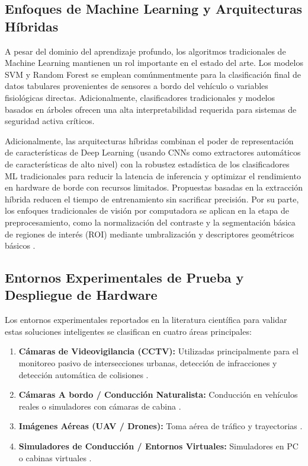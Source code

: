 \subsection{Enfoques de Machine Learning y Arquitecturas Híbridas}
A pesar del dominio del aprendizaje profundo, los algoritmos tradicionales de Machine Learning mantienen un rol importante en el estado del arte. Los modelos SVM \cite{abarghooei2026driving, ahmad2026comparative} y Random Forest \cite{uddin2025abnormal, usman2024distracted} se emplean comúnmentmente para la clasificación final de datos tabulares provenientes de sensores a bordo del vehículo o variables fisiológicas directas. Adicionalmente, clasificadores tradicionales \cite{essahraui2025realtime, wu2024driving} y modelos basados en árboles \cite{xue2023young, dong2022fatigue} ofrecen una alta interpretabilidad requerida para sistemas de seguridad activa críticos.

Adicionalmente, las arquitecturas híbridas \cite{ahmad2026comparative, essahraui2025realtime} combinan el poder de representación de características de Deep Learning (usando CNNs como extractores automáticos de características de alto nivel) con la robustez estadística de los clasificadores ML tradicionales para reducir la latencia de inferencia y optimizar el rendimiento en hardware de borde con recursos limitados. Propuestas basadas en la extracción híbrida \cite{mota2025integration, suresh2025traffic} reducen el tiempo de entrenamiento sin sacrificar precisión. Por su parte, los enfoques tradicionales de visión por computadora  se aplican en la etapa de preprocesamiento, como la normalización del contraste y la segmentación básica de regiones de interés (ROI) mediante umbralización y descriptores geométricos básicos .

\subsection{Entornos Experimentales de Prueba y Despliegue de Hardware}
Los entornos experimentales reportados en la literatura científica para validar estas soluciones inteligentes se clasifican en cuatro áreas principales:
\begin{enumerate}
    \item \textbf{Cámaras de Videovigilancia (CCTV):} Utilizadas principalmente para el monitoreo pasivo de intersecciones urbanas, detección de infracciones y detección automática de colisiones \cite{l2026safestreets, kumar2026intelligent}.
    \item \textbf{Cámaras A bordo / Conducción Naturalista:} Conducción en vehículos reales o simuladores con cámaras de cabina \cite{liu2026research, rahman2026costeffective}.
    \item \textbf{Imágenes Aéreas (UAV / Drones):} Toma aérea de tráfico y trayectorias \cite{kumar2026uavbased, bhavsar2025evaluating}.
    \item \textbf{Simuladores de Conducción / Entornos Virtuales:} Simuladores en PC o cabinas virtuales \cite{abarghooei2026driving, zambrano2026monitoring}.
\end{enumerate}

